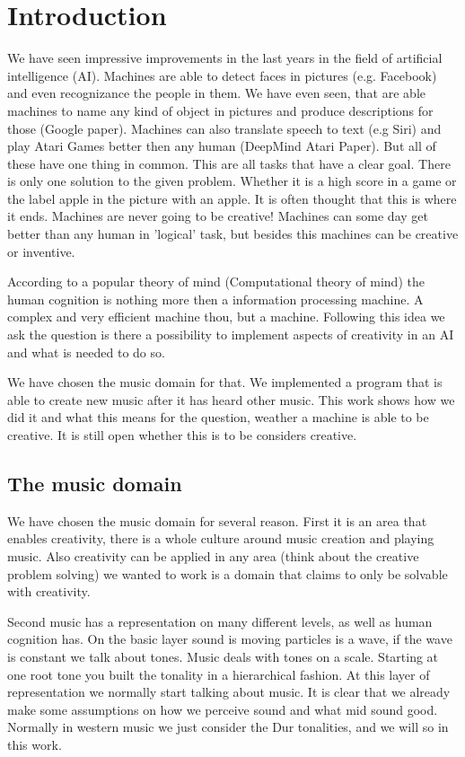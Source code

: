 \section{Introduction} 
We have seen impressive improvements in the last years in the field of artificial intelligence (AI). Machines are able to detect faces in pictures (e.g. Facebook) and even recognizance the people in them. We have even seen, that are able machines to name any kind of object in pictures and produce descriptions for those (Google paper). Machines can also translate speech to text (e.g Siri) and play Atari Games better then any human (DeepMind Atari Paper). But all of these have one thing in common. This are all tasks that have a clear goal. There is only one solution to the given problem. Whether it is a high score in a game or the label apple in the picture with an apple. It is often thought that this is where it ends. Machines are never going to be creative! Machines can some day get better than any human in 'logical' task, but besides this machines can be creative or inventive. 

According to a popular theory of mind (Computational theory of mind) 
the human cognition is nothing more then a information processing machine. A complex and very efficient machine thou, but a machine. Following this idea we ask the question is there a possibility to implement aspects of creativity in an AI and what is needed to do so.   

We have chosen the music domain for that. We implemented a program that is able to create new music after it has heard other music. This   work shows how we did it and what this means for the question, weather a machine is able to be creative. It is still open whether this is to be considers creative. 

\subsection{The music domain}
We have chosen the music domain for several reason. First it is an area that enables creativity, there is a whole culture around music creation and playing music. Also creativity can be applied in any area (think about the creative problem solving) we wanted to work is a domain that claims to only be solvable with creativity. 

Second music has a representation on many different levels, as well as human cognition has. On the basic layer sound is moving particles is a wave, if the wave is constant we talk about tones. Music deals with tones on a scale. Starting at one root tone you built the tonality in a hierarchical fashion. At this layer of representation we normally start talking about music. It is clear that we already make some assumptions on how we perceive sound and what mid sound good. Normally in western music we just consider the Dur tonalities, and we will so in this work. 

